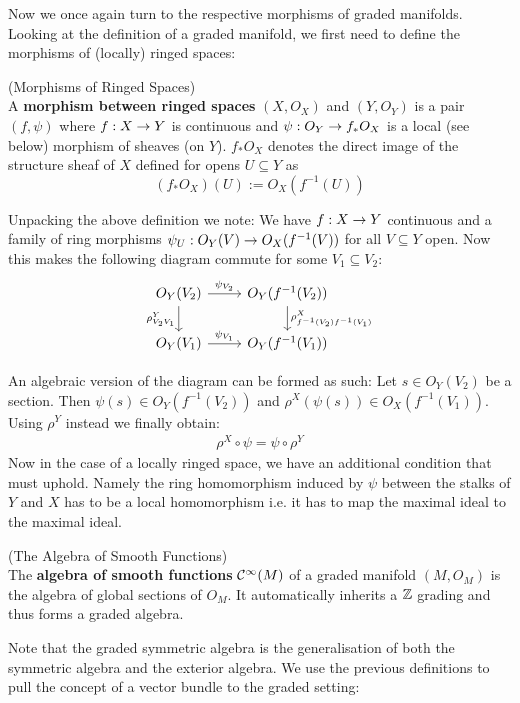Now we once again turn to the respective morphisms of graded manifolds. Looking at the definition of a graded manifold, we first need to define the morphisms of (locally) ringed spaces:

\begin{definition} (Morphisms of Ringed Spaces)\\
  A \textbf{morphism between ringed spaces} $(X,O_X)$ and $(Y,O_Y)$ is a pair $(f, \psi)$ where $f:X\rightarrow Y$ is continuous and $\psi:O_Y \rightarrow f_* O_X$
  is a local (see below) morphism  of sheaves (on $Y$). $f_* O_X$ denotes the direct image of the structure sheaf of $X$ defined for opens $U\subseteq Y$ as
  $$ (f_* O_X)(U) := O_X(f^{-1}(U)) $$
\end{definition}

Unpacking the above definition we note: We have $f:X \rightarrow Y$ continuous and a family of ring morphisms $\psi_U: O_Y(V) \rightarrow O_X(f^{-1}(V))$ for all $V\subseteq Y$ open. Now this makes the following diagram commute for some $V_1 \subseteq V_2$:
\[
\begin{tikzcd}
  O_Y(V_2) \arrow{r}{\psi_{V_2}} \arrow[swap]{d}{\rho^Y_{V_2 V_1}} & O_Y(f^{-1}(V_2)) \arrow{d}{\rho^X_{f^{-1}(V_2) f^{-1}(V_1)}} \\
  O_Y(V_1) \arrow{r}{\psi_{V_1}} & O_Y(f^{-1}(V_1))
\end{tikzcd}
\]

An algebraic version of the diagram can be formed as such: Let $s\in O_Y(V_2)$ be a section. Then $\psi(s) \in O_Y(f^{-1}(V_2))$ and $\rho^X(\psi(s)) \in O_X(f^{-1}(V_1))$. Using $\rho^Y$ instead we finally obtain:
\begin{align}
  \rho^X \circ \psi = \psi \circ \rho^Y
\end{align}
Now in the case of a locally ringed space, we have an additional condition that must uphold. Namely the ring homomorphism induced by $\psi$ between the stalks of $Y$ and $X$ has to be a local homomorphism i.e. it has to map the maximal ideal to the maximal ideal.

\begin{definition} (The Algebra of Smooth Functions)\\
  The \textbf{algebra of smooth functions} $\mathcal{C}^{\infty}(M)$ of a graded manifold $(M, O_M)$ is the algebra of global sections of $O_M$. It automatically inherits a $\mathbb{Z}$ grading and thus forms a graded algebra.
\end{definition}

Note that the graded symmetric algebra is the generalisation of both the symmetric algebra and the exterior algebra. We use the previous definitions to pull the concept of a vector bundle to the graded setting:

